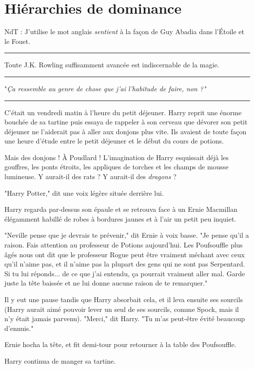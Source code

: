 
\chapter{Hiérarchies de dominance}

NdT : J'utilise le mot anglais \emph{sentient}  à la façon de Guy Abadia dans l'Étoile et le Fouet.
\par\noindent\rule{\textwidth}{0.4pt}
Toute J.K. Rowling suffisamment avancée est indiscernable de la magie.
\par\noindent\rule{\textwidth}{0.4pt}
"\emph{Ça ressemble au genre de chose que j'ai l'habitude de faire, non ?"} 
\par\noindent\rule{\textwidth}{0.4pt}
C'était un vendredi matin à l'heure du petit déjeuner. Harry reprit une énorme bouchée de sa tartine puis essaya de rappeler à son cerveau que dévorer son petit déjeuner ne l'aiderait pas à aller aux donjons plus vite. Ils avaient de toute façon une heure d'étude entre le petit déjeuner et le début du cours de potions.

Mais des donjons ! À Poudlard ! L'imagination de Harry esquissait déjà les gouffres, les ponts étroits, les appliques de torches et les champs de mousse lumineuse. Y aurait-il des rats ? Y aurait-il des \emph{dragons}  ?

"Harry Potter," dit une voix légère située derrière lui.

Harry regarda par-dessus son épaule et se retrouva face à un Ernie Macmillan élégamment habillé de robes à bordures jaunes et à l'air un petit peu inquiet.

"Neville pense que je devrais te prévenir," dit Ernie à voix basse. "Je pense qu'il a raison. Fais attention au professeur de Potions aujourd'hui. Les Poufsouffle plus âgés nous ont dit que le professeur Rogue peut être vraiment méchant avec ceux qu'il n'aime pas, et il n'aime pas la plupart des gens qui ne sont pas Serpentard. Si tu lui réponds... de ce que j'ai entendu, ça pourrait vraiment aller mal. Garde juste la tête baissée et ne lui donne aucune raison de te remarquer."

Il y eut une pause tandis que Harry absorbait cela, et il leva ensuite ses sourcils (Harry aurait aimé pouvoir lever un seul de ses sourcils, comme Spock, mais il n'y était jamais parvenu). "Merci," dit Harry. "Tu m'as peut-être évité beaucoup d'ennuis."

Ernie hocha la tête, et fit demi-tour pour retourner à la table des Poufsouffle.

Harry continua de manger sa tartine.

